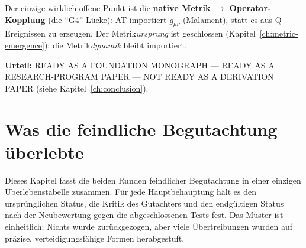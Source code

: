 \documentclass[10pt,twoside,openany]{book}
\begin{document}
Der einzige wirklich offene Punkt ist die \textbf{native Metrik $\to$ Operator-Kopplung}
(die ``G4''-Lücke): AT importiert $g_{\mu\nu}$ (Malament), statt es aus Q-Ereignissen zu
erzeugen. Der Metrik\emph{ursprung} ist geschlossen
(Kapitel~\ref{ch:metric-emergence}); die Metrik\emph{dynamik} bleibt importiert.

\textbf{Urteil:} READY AS A FOUNDATION MONOGRAPH --- READY AS A RESEARCH-PROGRAM PAPER
--- NOT READY AS A DERIVATION PAPER (siehe Kapitel~\ref{ch:conclusion}).


\chapter{Was die feindliche Begutachtung überlebte}
\label{ch:survived}

Dieses Kapitel fasst die beiden Runden feindlicher Begutachtung in einer einzigen
Überlebenstabelle zusammen. Für jede Hauptbehauptung hält es den ursprünglichen Status,
die Kritik des Gutachters und den endgültigen Status nach der Neubewertung gegen die
abgeschlossenen Tests fest. Das Muster ist einheitlich: Nichts wurde zurückgezogen, aber
viele Übertreibungen wurden auf präzise, verteidigungsfähige Formen herabgestuft.
\end{document}

